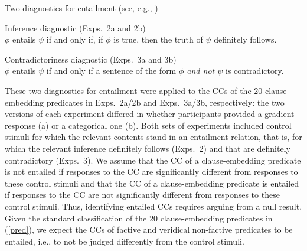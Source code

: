 \documentclass[11pt,fleqn]{article}
\newcommand{\6}{\mbox{$[\hspace*{-.6mm}[$}}
\newcommand{\9}{\mbox{$]\hspace*{-.6mm}]$}}
\begin{document}
\begin{exe}
\ex\label{diag} Two diagnostics for entailment \hfill (see, e.g., \citealt[\S3.1]{ccmg90})
\begin{xlist}
\ex  Inference diagnostic (Exps.~2a and 2b)\\ $\phi$ entails $\psi$ if and only if, if $\phi$ is true, then the truth of $\psi$ definitely follows. 

\ex  Contradictoriness diagnostic  (Exps.~3a and 3b)\\ $\phi$ entails $\psi$ if and only if a sentence of the form {\em $\phi$ and not $\psi$} is contradictory. 

\end{xlist}
\end{exe}
These two diagnostics for entailment were applied to the CCs of the 20 clause-embedding predicates in Exps.~2a/2b and Exps.~3a/3b, respectively: the two versions of each experiment differed in whether participants provided a gradient response (a) or a categorical one (b).  Both sets of experiments included control stimuli for which the relevant contents stand in an entailment relation, that is, for which the relevant inference definitely follows (Exps.~2) and that are definitely contradictory (Exps.~3). We assume that the CC of a clause-embedding predicate is not entailed if responses to the CC are significantly different from responses to these control stimuli and that the CC of a clause-embedding predicate is entailed if responses to the CC are not significantly different from responses to these control stimuli. Thus, identifying entailed CCs  requires arguing from a null result. Given the standard classification of the 20 clause-embedding predicates in (\ref{pred}), we expect the CCs of factive and veridical non-factive predicates to be entailed, i.e., to not be judged   differently from the control stimuli.

\end{document}
